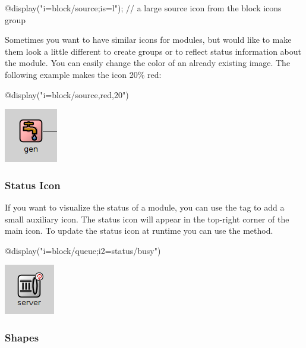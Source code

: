 \begin{ned}
@display("i=block/source;is=l"); // a large source icon from the block icons group
\end{ned}

Sometimes you want to have similar icons for modules, but would like to
make them look a little different to create groups or to reflect status
information about the module. You can easily change the color of an already
existing image. The following example makes the icon 20\% red:

\begin{ned}
@display("i=block/source,red,20")
\end{ned}

\begin{center}
\includegraphics{figures/graphics-itag}
\end{center}

\subsubsection{Status Icon}

If you want to visualize the status of a module, you can use the 
tag to add a small auxiliary icon. The status icon will appear in the top-right corner
of the main icon. To update the status icon at runtime you can use the
 method.

\begin{ned}
@display("i=block/queue;i2=status/busy")
\end{ned}

\begin{center}
\includegraphics{figures/graphics-i2tag}
\end{center}

\subsubsection{Shapes}

